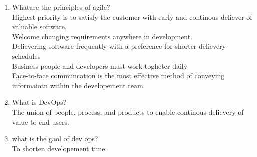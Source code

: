 \documentclass[10pt]{article}
\begin{document}
\begin{enumerate}
      \item Whatare the principles of agile?\\
            Highest priority is to satisfy the customer with early and continous deliever of valuable software.\\
            Welcome changing requirements anywhere in development.\\
            Delievering software frequently with a preference for shorter delievery schedules\\
            Business people and developers must work togheter daily\\
            Face-to-face communcation is the most effective method of conveying informaiotn within the developement team.\\

      \item What is DevOps?\\
            The union of people, process, and products to enable continous delievery of value to end users.\\

      \item what is the gaol of dev ops?\\
            To shorten developement time.\\

\end{enumerate}
\end{document}
